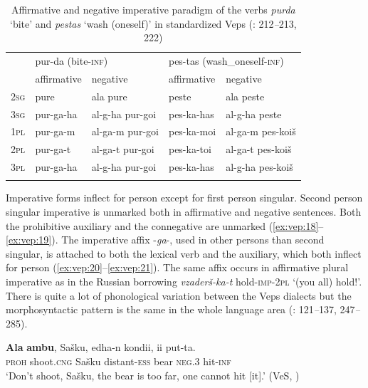 \documentclass[output=paper,colorlinks=true, citecolor=brown]{langscibook}
\begin{document}
\begin{table}
\centering
\begin{tabularx}{.9\textwidth}{lllll}
\lsptoprule
& \multicolumn{2}{l}{pur{}-da (bite\textsc{{}-inf})} & \multicolumn{2}{l}{pes-tas (wash\_oneself\textsc{{}-inf})} \\
& {affirmative}  & {negative} & {affirmative}  & {negative}\\
\midrule 
\textsc{2sg} & pure & ala pure & peste & ala peste \\
\textsc{3sg} & pur-ga-ha & al-g-ha pur-goi & pes-ka-has & al-g-ha peste \\
\textsc{1pl} & pur-ga-m & al-ga-m pur-goi & pes-ka-moi & al-ga-m pes-koiš \\
\textsc{2pl} & pur-ga-t & al-ga-t pur-goi & pes-ka-toi & al-ga-t pes-koiš \\
\textsc{3pl} & pur-ga-ha & al-g-ha pur-goi & pes-ka-has & al-g-ha pes-koiš \\
\lspbottomrule
\end{tabularx}
    \caption{Affirmative and negative imperative paradigm of the verbs \textit{purda} ‘bite’ and \textit{pestas} ‘wash (oneself)’ in standardized Veps (\citealt{Zaitseva2000}: 212\textit{–}213, 222)}
    \label{tab:vep:3}
\end{table}

Imperative forms inflect for person except for first person singular. Second person singular imperative is unmarked both in affirmative and negative sentences. Both the prohibitive auxiliary and the connegative are unmarked (\ref{ex:vep:18}--\ref{ex:vep:19}). The imperative affix -\textit{ga}{}-, used in other persons than second singular, is attached to both the lexical verb and the auxiliary, which both inflect for person (\ref{ex:vep:20}--\ref{ex:vep:21}). The same affix occurs in affirmative plural imperative as in the Russian borrowing \textit{vzaderš-ka-t} hold-\textsc{imp}{}-2\textsc{pl} ‘(you all) hold!’. There is quite a lot of phonological variation between the Veps dialects but the morphosyntactic pattern is the same in the whole language area (\citealt{Zaitseva2001}: 121\textit{–}137, 247\textit{–}285).

\ea
    \label{ex:vep:18}
    \gll \textbf{Ala} \textbf{ambu}, Sašku, edha{}-n kondii, ii put{}-ta.\\
         \textsc{proh} shoot.\textsc{cng} Sašku distant\textsc{{}-ess} bear \textsc{neg.3} hit\textsc{{}-inf}\\
    \glt ‘Don’t shoot, Sašku, the bear is too far, one cannot hit [it].’ (VeS, \citealt[99]{Kettunen1920})
\z 
\end{document}
